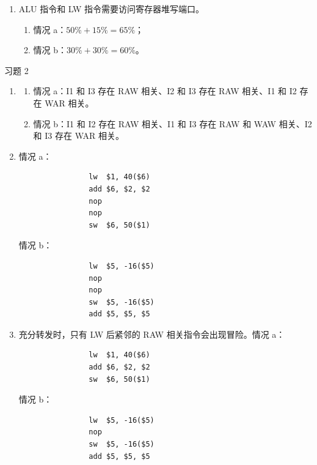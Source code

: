 \begin{problem}
\begin{solution}
\begin{enumerate}
            \item[\textbf{5)}] ALU 指令和 LW 指令需要访问寄存器堆写端口。
            \begin{enumerate}
                \item 情况 a：$50\% + 15\% = 65\%$；
                \item 情况 b：$30\% + 30\% = 60\%$。
            \end{enumerate}
        \end{enumerate}
    \end{solution}
\end{problem}

\begin{problem}
    习题 2
    \begin{solution}
        \begin{enumerate}
            \item[\textbf{1)}] 
            \begin{enumerate}
                \item 情况 a：I1 和 I3 存在 RAW 相关、I2 和 I3 存在 RAW 相关、I1 和 I2 存在 WAR 相关。
                \item 情况 b：I1 和 I2 存在 RAW 相关、I1 和 I3 存在 RAW 和 WAW 相关、I2 和 I3 存在 WAR 相关。
            \end{enumerate}

            \item[\textbf{2)}] 情况 a：
            \begin{verbatim}
                lw  $1, 40($6)
                add $6, $2, $2
                nop
                nop
                sw  $6, 50($1)
            \end{verbatim}
            情况 b：
            \begin{verbatim}
                lw  $5, -16($5)
                nop
                nop
                sw  $5, -16($5)
                add $5, $5, $5
            \end{verbatim}

            \item[\textbf{3)}] 充分转发时，只有 LW 后紧邻的 RAW 相关指令会出现冒险。情况 a：
            \begin{verbatim}
                lw  $1, 40($6)
                add $6, $2, $2
                sw  $6, 50($1)
            \end{verbatim}
            情况 b：
            \begin{verbatim}
                lw  $5, -16($5)
                nop
                sw  $5, -16($5)
                add $5, $5, $5
            \end{verbatim}


\end{enumerate}
\end{solution}
\end{problem}
